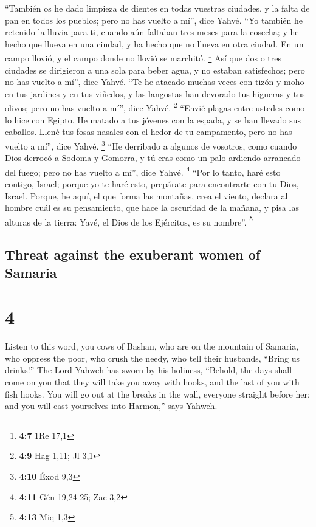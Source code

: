 \begin{paracol}{2}
 ``También os he dado limpieza de dientes en todas
vuestras ciudades, y la falta de pan en todos los pueblos; pero no has
vuelto a mí'', dice Yahvé.  ``Yo también he retenido la
lluvia para ti, cuando aún faltaban tres meses para la cosecha; y he
hecho que llueva en una ciudad, y ha hecho que no llueva en otra ciudad.
En un campo llovió, y el campo donde no llovió se marchitó. \footnote{\textbf{4:7}
  1Re 17,1}  Así que dos o tres ciudades se dirigieron a
una sola para beber agua, y no estaban satisfechos; pero no has vuelto a
mí'', dice Yahvé.  ``Te he atacado muchas veces con tizón
y moho en tus jardines y en tus viñedos, y las langostas han devorado
tus higueras y tus olivos; pero no has vuelto a mí'', dice Yahvé.
\footnote{\textbf{4:9} Hag 1,11; Jl 3,1}  ``Envié plagas
entre ustedes como lo hice con Egipto. He matado a tus jóvenes con la
espada, y se han llevado sus caballos. Llené tus fosas nasales con el
hedor de tu campamento, pero no has vuelto a mí'', dice Yahvé.
\footnote{\textbf{4:10} Éxod 9,3}  ``He derribado a
algunos de vosotros, como cuando Dios derrocó a Sodoma y Gomorra, y tú
eras como un palo ardiendo arrancado del fuego; pero no has vuelto a
mí'', dice Yahvé. \footnote{\textbf{4:11} Gén 19,24-25; Zac 3,2}
 ``Por lo tanto, haré esto contigo, Israel; porque yo te
haré esto, prepárate para encontrarte con tu Dios, Israel.
 Porque, he aquí, el que forma las montañas, crea el
viento, declara al hombre cuál es su pensamiento, que hace la oscuridad
de la mañana, y pisa las alturas de la tierra: Yavé, el Dios de los
Ejércitos, es su nombre''. \footnote{\textbf{4:13} Miq 1,3}

\switchcolumn
\begin{otherlanguage}{english}

\hypertarget{threat-against-the-exuberant-women-of-samaria}{%
\subsection{Threat against the exuberant women of
Samaria}\label{threat-against-the-exuberant-women-of-samaria}}

\hypertarget{section-7}{%
\section{4}\label{section-7}}

 Listen to this word, you cows of Bashan, who are on the
mountain of Samaria, who oppress the poor, who crush the needy, who tell
their husbands, ``Bring us drinks!''  The Lord Yahweh has
sworn by his holiness, ``Behold, the days shall come on you that they
will take you away with hooks, and the last of you with fish hooks.
 You will go out at the breaks in the wall, everyone
straight before her; and you will cast yourselves into Harmon,'' says
Yahweh.


\end{otherlanguage}
\end{paracol}
